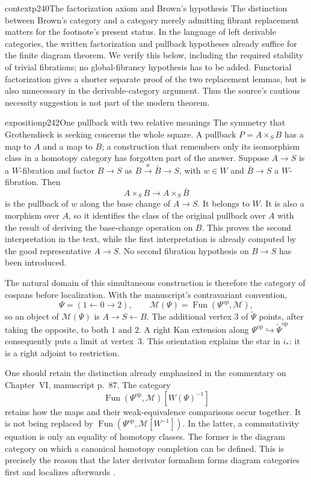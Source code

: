 \begin{dcomment}{context}{p240}{The factorization axiom and Brown's hypothesis}
The distinction between Brown's category and a category merely admitting fibrant replacement matters for the footnote's present status. In the language of left derivable categories, the written factorization and pullback hypotheses already suffice for the finite diagram theorem. We verify this below, including the required stability of trivial fibrations; no global-fibrancy hypothesis has to be added. Functorial factorization gives a shorter separate proof of the two replacement lemmas, but is also unnecessary in the derivable-category argument. Thus the source's cautious necessity suggestion is not part of the modern theorem.
\end{dcomment}

\begin{dcomment}{exposition}{p242}{One pullback with two relative meanings}
The symmetry that Grothendieck is seeking concerns the whole square. A pullback $P=A\times_S B$ has a map to $A$ and a map to $B$; a construction that remembers only its isomorphism class in a homotopy category has forgotten part of the answer. Suppose $A\to S$ is a $W$-fibration and factor $B\to S$ as $B\xrightarrow{w}\bar B\to S$, with $w\in W$ and $\bar B\to S$ a $W$-fibration. Then
\[
 A\times_S B\longrightarrow A\times_S\bar B
\]
is the pullback of $w$ along the base change of $A\to S$. It belongs to $W$. It is also a morphism over $A$, so it identifies the class of the original pullback over $A$ with the result of deriving the base-change operation on $B$. This proves the second interpretation in the text, while the first interpretation is already computed by the good representative $A\to S$. No second fibration hypothesis on $B\to S$ has been introduced.

The natural domain of this simultaneous construction is therefore the category of cospans before localization. With the manuscript's contravariant convention,
\[
 \Psi=(1\leftarrow0\to2),\qquad
 \mathcal M(\Psi)=\operatorname{Fun}(\Psi^{\mathrm{op}},\mathcal M),
\]
so an object of $\mathcal M(\Psi)$ is $A\to S\leftarrow B$. The additional vertex $3$ of $\tilde\Psi$ points, after taking the opposite, to both $1$ and $2$. A right Kan extension along $\Psi^{\mathrm{op}}\hookrightarrow\tilde\Psi^{\mathrm{op}}$ consequently puts a limit at vertex~$3$. This orientation explains the star in $i_*$: it is a right adjoint to restriction.

One should retain the distinction already emphasized in the commentary on Chapter~VI, manuscript p.~87. The category
\[
 \operatorname{Fun}(\Psi^{\mathrm{op}},\mathcal M)[W(\Psi)^{-1}]
\]
retains how the maps and their weak-equivalence comparisons occur together. It is not being replaced by $\operatorname{Fun}(\Psi^{\mathrm{op}},\mathcal M[W^{-1}])$. In the latter, a commutativity equation is only an equality of homotopy classes. The former is the diagram category on which a canonical homotopy completion can be defined. This is precisely the reason that the later derivator formalism forms diagram categories first and localizes afterwards \citep[pp.~313--315]{Groth2013}.


\end{dcomment}
